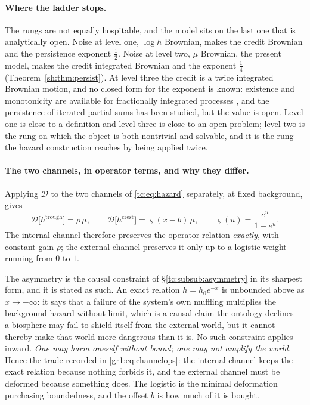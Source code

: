 \documentclass[11pt]{article}
\numberwithin{equation}{section}
\theoremstyle{plain}
\theoremstyle{definition}
\theoremstyle{remark}
\begin{document}
\paragraph{Where the ladder stops.}\label{gr1:rem:ladderstops}
The rungs are not equally hospitable, and the model sits on the last one
that is analytically open. Noise at level one, $\log h$ Brownian, makes the credit Brownian and the persistence exponent $\tfrac12$. Noise
at level two, $\mu$ Brownian, the present model, makes the credit
integrated Brownian and the exponent $\tfrac14$
(Theorem~\ref{sh:thm:persist}). At level three the credit is a twice
integrated Brownian motion, and no closed form for the exponent is
known: existence and monotonicity are available for fractionally
integrated processes \cite{AD13,AS15}, and the persistence of iterated
partial sums has been studied, but the value is open. Level one is close
to a definition and level three is close to an open problem; level two
is the rung on which the object is both nontrivial and solvable, and it
is the rung the hazard construction reaches by being applied twice.

\paragraph{The two channels, in operator terms, and why they differ.}\label{gr1:rem:channelsoperator}
Applying $\mathcal D$ to the two channels of \eqref{tc:eq:hazard}
separately, at fixed background, gives
\begin{equation}\label{gr1:eq:channelops}
\mathcal D\bigl[h^{\mathrm{trough}}\bigr]=\rho\,\mu,
\qquad
\mathcal D\bigl[h^{\mathrm{crest}}\bigr]=\varsigma(x-b)\,\mu,
\qquad
\varsigma(u)=\frac{e^{u}}{1+e^{u}} .
\end{equation}
The internal channel therefore preserves the operator relation
\emph{exactly}, with constant gain $\rho$; the external channel
preserves it only up to a logistic weight running from $0$ to $1$.

The asymmetry is the causal constraint of
\S\ref{tc:subsub:asymmetry} in its sharpest form, and it is stated as such. An exact relation $h=h_0e^{-x}$ is unbounded above as
$x\to-\infty$: it says that a failure of the system's own muffling
multiplies the background hazard without limit, which is a causal claim
the ontology declines --- a biosphere may fail to shield itself from the
external world, but it cannot thereby make that world more dangerous
than it is. No such constraint applies inward. \emph{One may harm
oneself without bound; one may not amplify the world.} Hence the trade
recorded in \eqref{gr1:eq:channelops}: the internal channel keeps the
exact relation because nothing forbids it, and the external channel must
be deformed because something does. The logistic is the minimal
deformation purchasing boundedness, and the offset $b$ is how much of it
is bought.
\end{document}
